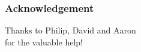 \documentclass[fleqn]{beamer}
\begin{document}

\begin{frame}
\frametitle{Acknowledgement}
\begin{center}
Thanks to Philip, David and Aaron\\
for the valuable help!
\end{center}
   
\end{frame}
\end{document}
